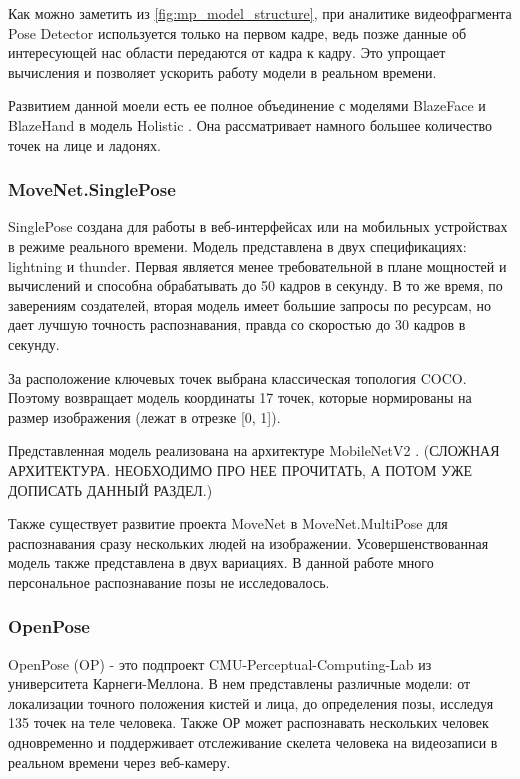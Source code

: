 Как можно заметить из \autoref{fig:mp_model_structure}, при аналитике видеофрагмента Pose Detector используется только на первом кадре, ведь позже данные об интересующей нас области передаются от кадра к кадру. Это упрощает вычисления и позволяет ускорить работу модели в реальном времени.

Развитием данной моели есть ее полное объединение с моделями BlazeFace и BlazeHand в модель Holistic \cite{Holistic}. Она рассматривает намного большее количество точек на лице и ладонях. 




\subsubsection{MoveNet.SinglePose}

SinglePose создана для работы в веб-интерфейсах или на мобильных устройствах в режиме реального времени. Модель представлена в двух спецификациях: lightning и thunder. Первая является менее требовательной в плане мощностей и вычислений и способна обрабатывать до 50 кадров в секунду. В то же время, по заверениям создателей, вторая модель имеет большие запросы по ресурсам, но дает лучшую точность распознавания, правда со скоростью до 30 кадров в секунду.

За расположение ключевых точек выбрана классическая топология COCO. Поэтому возвращает модель координаты 17 точек, которые нормированы на размер изображения (лежат в отрезке [0, 1]).

\hfill \break
Представленная модель реализована на архитектуре MobileNetV2 \cite{mobilenetv2}. (СЛОЖНАЯ АРХИТЕКТУРА. НЕОБХОДИМО ПРО НЕЕ ПРОЧИТАТЬ, А ПОТОМ УЖЕ ДОПИСАТЬ ДАННЫЙ РАЗДЕЛ.)

Также существует развитие проекта MoveNet в MoveNet.MultiPose для распознавания сразу нескольких людей на изображении. Усовершенствованная модель также представлена в двух вариациях. В данной работе много персональное распознавание позы не исследовалось.




\subsubsection{OpenPose}

OpenPose (OP) - это подпроект CMU-Perceptual-Computing-Lab из университета Карнеги-Меллона. В нем представлены различные модели: от локализации точного положения кистей и лица, до определения позы, исследуя 135 точек на теле человека. Также ОР может распознавать нескольких человек одновременно и поддерживает отслеживание скелета человека на видеозаписи в реальном времени через веб-камеру.

